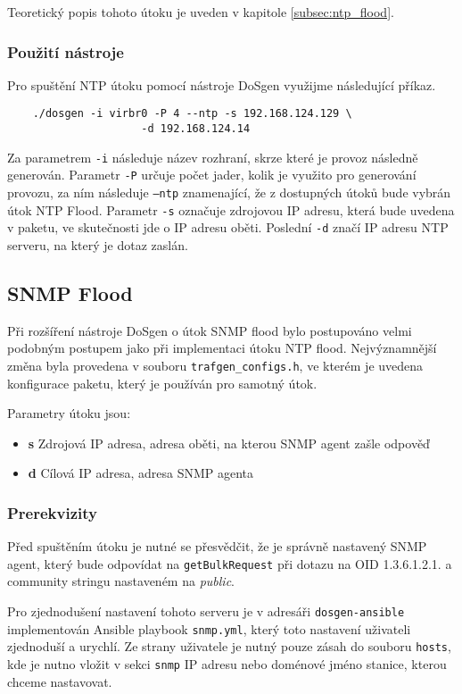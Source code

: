 Teoretický popis tohoto útoku je uveden v kapitole \ref{subsec:ntp_flood}.

\subsubsection{Použití nástroje}
Pro spuštění NTP útoku pomocí nástroje DoSgen využijme následující příkaz.
\begin{lstlisting}
	./dosgen -i virbr0 -P 4 --ntp -s 192.168.124.129 \
                     -d 192.168.124.14
\end{lstlisting}

Za parametrem \texttt{-i} následuje název rozhraní, skrze které je provoz následně generován. Parametr \texttt{-P} určuje počet jader, kolik je využito pro generování provozu, za ním následuje \texttt{--ntp} znamenající, že z dostupných útoků bude vybrán útok NTP Flood. Parametr \texttt{-s} označuje zdrojovou IP adresu, která bude uvedena v paketu, ve skutečnosti jde o IP adresu oběti. Poslední \texttt{-d} značí IP adresu NTP serveru, na který je dotaz zaslán.

\label{subsec:snmp_flood_impl}
\subsection{SNMP Flood}
Při rozšíření nástroje DoSgen o útok SNMP flood bylo postupováno velmi podobným postupem jako při implementaci útoku NTP flood. Nejvýznamnější změna byla provedena v souboru \texttt{trafgen\_configs.h}, ve kterém je uvedena konfigurace paketu, který je používán pro samotný útok.

\noindent Parametry útoku jsou:
\begin{itemize}
	\item \textbf{s} Zdrojová IP adresa, adresa oběti, na kterou SNMP agent zašle odpověď
	\item \textbf{d} Cílová IP adresa, adresa SNMP agenta
\end{itemize}

\subsubsection{Prerekvizity}
Před spuštěním útoku je nutné se přesvědčit, že je správně nastavený SNMP agent, který bude odpovídat na \texttt{getBulkRequest} při dotazu na OID 1.3.6.1.2.1. a community stringu nastaveném na \textit{public}.

Pro zjednodušení nastavení tohoto serveru je v adresáři \texttt{dosgen-ansible} implementován Ansible playbook \texttt{snmp.yml}, který toto nastavení uživateli zjednoduší a urychlí. Ze strany uživatele je nutný pouze zásah do souboru \texttt{hosts}, kde je nutno vložit v sekci \texttt{snmp} IP adresu nebo doménové jméno stanice, kterou chceme nastavovat.

